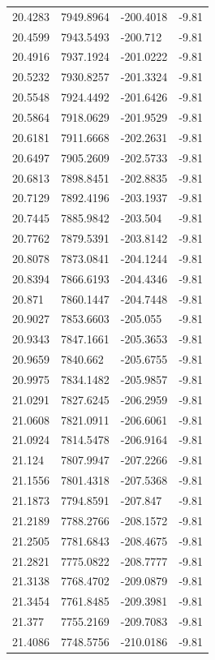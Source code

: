\begin{table}[H]
\begin{tabular}{llll}
20.4283 & 7949.8964 & -200.4018 & -9.81 \\
20.4599 & 7943.5493 & -200.712 & -9.81 \\
20.4916 & 7937.1924 & -201.0222 & -9.81 \\
20.5232 & 7930.8257 & -201.3324 & -9.81 \\
20.5548 & 7924.4492 & -201.6426 & -9.81 \\
20.5864 & 7918.0629 & -201.9529 & -9.81 \\
20.6181 & 7911.6668 & -202.2631 & -9.81 \\
20.6497 & 7905.2609 & -202.5733 & -9.81 \\
20.6813 & 7898.8451 & -202.8835 & -9.81 \\
20.7129 & 7892.4196 & -203.1937 & -9.81 \\
20.7445 & 7885.9842 & -203.504 & -9.81 \\
20.7762 & 7879.5391 & -203.8142 & -9.81 \\
20.8078 & 7873.0841 & -204.1244 & -9.81 \\
20.8394 & 7866.6193 & -204.4346 & -9.81 \\
20.871 & 7860.1447 & -204.7448 & -9.81 \\
20.9027 & 7853.6603 & -205.055 & -9.81 \\
20.9343 & 7847.1661 & -205.3653 & -9.81 \\
20.9659 & 7840.662 & -205.6755 & -9.81 \\
20.9975 & 7834.1482 & -205.9857 & -9.81 \\
21.0291 & 7827.6245 & -206.2959 & -9.81 \\
21.0608 & 7821.0911 & -206.6061 & -9.81 \\
21.0924 & 7814.5478 & -206.9164 & -9.81 \\
21.124 & 7807.9947 & -207.2266 & -9.81 \\
21.1556 & 7801.4318 & -207.5368 & -9.81 \\
21.1873 & 7794.8591 & -207.847 & -9.81 \\
21.2189 & 7788.2766 & -208.1572 & -9.81 \\
21.2505 & 7781.6843 & -208.4675 & -9.81 \\
21.2821 & 7775.0822 & -208.7777 & -9.81 \\
21.3138 & 7768.4702 & -209.0879 & -9.81 \\
21.3454 & 7761.8485 & -209.3981 & -9.81 \\
21.377 & 7755.2169 & -209.7083 & -9.81 \\
21.4086 & 7748.5756 & -210.0186 & -9.81 \\

\end{tabular}
\end{table}
